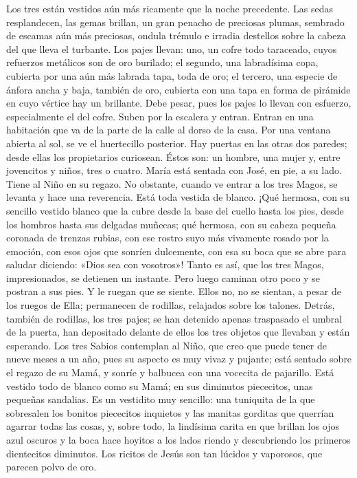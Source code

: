 \documentclass[12pt]{book} %
\begin{document}
Los tres están vestidos aún más ricamente que la noche precedente. Las sedas resplandecen, las gemas brillan, un gran penacho de preciosas plumas, sembrado de escamas aún más preciosas, ondula trémulo e irradia destellos sobre la cabeza del que lleva el turbante. 
Los pajes llevan: uno, un cofre todo taraceado, cuyos refuerzos metálicos son de oro burilado; el segundo, una 
labradísima copa, cubierta por una aún más labrada tapa, toda de oro; el tercero, una especie de ánfora ancha y baja, también de oro, cubierta con una tapa en forma de pirámide en cuyo vértice hay un brillante. Debe pesar, pues los pajes lo llevan con esfuerzo, especialmente el del cofre. 
Suben por la escalera y entran. Entran en una habitación que va de la parte de la calle al dorso de la casa. Por una 
ventana abierta al sol, se ve el huertecillo posterior. Hay puertas en las otras dos paredes; desde ellas los propietarios curiosean. 
Éstos son: un hombre, una mujer y, entre jovencitos y niños, tres o cuatro. 
María está sentada con José, en pie, a su lado. Tiene al Niño en su regazo. No obstante, cuando ve entrar a los tres Magos, se levanta y hace una reverencia. Está toda vestida de blanco. ¡Qué hermosa, con su sencillo vestido blanco que la cubre desde la base del cuello hasta los pies, desde los hombros hasta sus delgadas muñecas; qué hermosa, con su cabeza pequeña coronada de trenzas rubias, con ese rostro suyo más vivamente rosado por la emoción, con esos ojos que sonríen dulcemente, con esa su boca que se abre para saludar diciendo: «Dios sea con vosotros»! Tanto es así, que los tres Magos, impresionados, se detienen un instante. Pero luego caminan otro poco y se postran a sus pies. Y le ruegan que se siente. 
Ellos no, no se sientan, a pesar de los ruegos de Ella; permanecen de rodillas, relajados sobre los talones. Detrás, 
también de rodillas, los tres pajes; se han detenido apenas traspasado el umbral de la puerta, han depositado delante de ellos los tres objetos que llevaban y están esperando. 
Los tres Sabios contemplan al Niño, que creo que puede tener de nueve meses a un año, pues su aspecto es muy vivaz y 
pujante; está sentado sobre el regazo de su Mamá, y sonríe y balbucea con una vocecita de pajarillo. Está vestido todo de blanco como su Mamá; en sus diminutos piececitos, unas pequeñas sandalias. Es un vestidito muy sencillo: una tuniquita de la que sobresalen los bonitos piececitos inquietos y las manitas gorditas que querrían agarrar todas las cosas, y, sobre todo, la lindísima carita en que brillan los ojos azul oscuros y la boca hace hoyitos a los lados riendo y descubriendo los primeros dientecitos diminutos. Los ricitos de Jesús son tan lúcidos y vaporosos, que parecen polvo de oro.              
\end{document}
